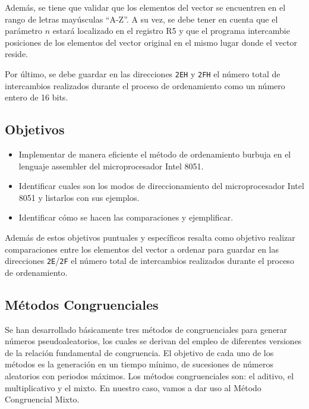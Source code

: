 \documentclass[doc, donotrepeattitle, biblatex, apacite]{apa6}
\begin{document}
Además, se tiene que validar que los elementos del vector se encuentren en el rango de letras mayúsculas “A-Z”. A su vez, se debe tener en cuenta que el parámetro $n$ estará localizado en el registro R5 y que el programa intercambie posiciones de los elementos del vector original en el mismo lugar donde el vector reside.

Por último, se debe guardar en las direcciones \texttt{2EH} y \texttt{2FH} el número total de intercambios realizados durante el proceso de ordenamiento como un número entero de 16 bits.

\subsection{Objetivos}
\begin{itemize}
\item Implementar de manera eficiente el método de ordenamiento burbuja en el lenguaje assembler del microprocesador
Intel 8051.
\item Identificar cuales son los modos de direccionamiento del microprocesador Intel 8051 y listarlos con sus ejemplos.
\item Identificar cómo se hacen las comparaciones y ejemplificar.
\end{itemize}

Además de estos objetivos puntuales y específicos resalta como objetivo realizar comparaciones entre los elementos del vector a ordenar para guardar en las direcciones \texttt{2E}/\texttt{2F} el número total de intercambios realizados durante el proceso de ordenamiento.

\subsection{Métodos Congruenciales}
Se han desarrollado básicamente tres métodos de congruenciales para generar
números pseudoaleatorios, los cuales se derivan del empleo de diferentes
versiones de la relación fundamental de congruencia. El objetivo de cada uno de
los métodos es la generación en un tiempo mínimo, de sucesiones de números
aleatorios con periodos máximos. Los métodos congruenciales son: el aditivo, el
multiplicativo y el mixto. En nuestro caso, vamos a dar uso al Método Congruencial Mixto.
\end{document}
